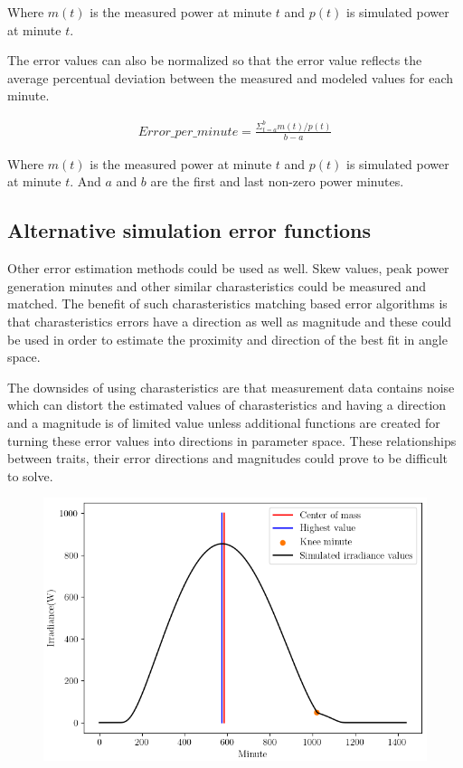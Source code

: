 \noindent Where $m(t)$ is the measured power at minute $t$ and $p(t)$ is simulated power at minute $t$.

\vspace{5mm}
\noindent The error values can also be normalized so that the error value reflects the average percentual deviation between the measured and modeled values for each minute.

\begin{align}
	Error\_per\_minute =  \frac{\Sigma_{t=a}^{b} m(t)/p(t)}{b-a} \label{areaerrorpercents}
\end{align}

\noindent Where $m(t)$ is the measured power at minute $t$ and $p(t)$ is simulated power at minute $t$. And $a$ and $b$ are the first and last non-zero power minutes.

\subsection{Alternative simulation error functions}
\noindent Other error estimation methods could be used as well. Skew values, peak power generation minutes and other similar charasteristics could be measured and matched. The benefit of such charasteristics matching based error algorithms is that charasteristics errors have a direction as well as magnitude and these could be used in order to estimate the proximity and direction of the best fit in angle space. 

The downsides of using charasteristics are that measurement data contains noise which can distort the estimated values of charasteristics and having a direction and a magnitude is of limited value unless additional functions are created for turning these error values into directions in parameter space. These relationships between traits, their error directions and magnitudes could prove to be difficult to solve.



\begin{figure}[h]
\centering
\includegraphics[width=0.5\linewidth]{pics/poa_charasteristics}
\label{fig_charasteristics}
\end{figure}




